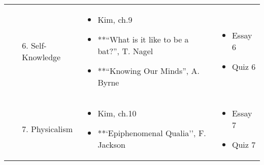 \documentclass[article,oneside]{memoir}
\begin{document}
\begin{centering}
\begin{tabular}{| p{4cm} | p{7cm} | p{3cm} |}
\begin{enumerate} \item[6.] Self-Knowledge \end{enumerate}
&\begin{itemize}
\item Kim, ch.9
\item **``What is it like to be a bat?'', T. Nagel
\item**``Knowing Our Minds'', A. Byrne \end{itemize}   
& \begin{itemize}  \item Essay 6 \item Quiz 6 \end{itemize} \\

\begin{enumerate} \item[7.] Physicalism \end{enumerate}
&\begin{itemize}\item Kim, ch.10
\item**`Epiphenomenal Qualia'', F. Jackson \end{itemize}   
& \begin{itemize}  \item Essay 7 \item Quiz 7 \end{itemize}\\ \hline
    \end{tabular}

\end{centering}








\end{document}
